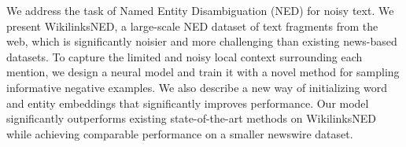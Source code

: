 We address the task of Named Entity Disambiguation (NED) for noisy text. We present WikilinksNED, a large-scale NED dataset of text fragments from the web, which is significantly noisier and more challenging than existing news-based datasets. To capture the limited and noisy local context surrounding each mention, we design a neural model and train it with a novel method for sampling informative negative examples. We also describe a new way of initializing word and entity embeddings that significantly improves performance. Our model significantly outperforms existing state-of-the-art methods on WikilinksNED while achieving comparable performance on a smaller newswire dataset.
